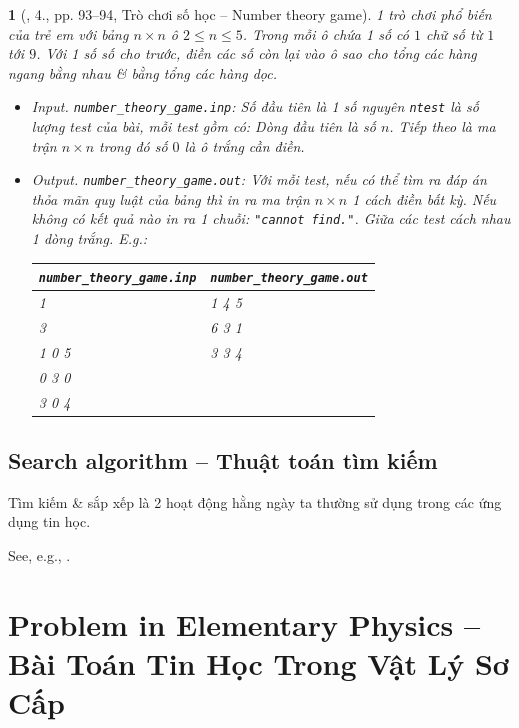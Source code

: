 \documentclass{article}
\newtheorem{baitoan}{}
\begin{document}
\begin{baitoan}[\cite{VietSTEM2021}, 4., pp. 93--94, Trò chơi số học -- Number theory game]
	1 trò chơi phổ biến của trẻ em với bảng $n\times n$ ô $2\le n\le5$. Trong mỗi ô chứa 1 số có $1$ chữ số từ $1$ tới $9$. Với 1 số số cho trước, điền các số còn lại vào ô sao cho tổng các hàng ngang bằng nhau \& bằng tổng các hàng dọc.
	\begin{itemize}
		\item {\sf Input.} \verb|number_theory_game.inp|: Số đầu tiên là 1 số nguyên {\tt ntest} là số lượng test của bài, mỗi test gồm có: Dòng đầu tiên là số $n$. Tiếp theo là ma trận $n\times n$ trong đó số $0$ là ô trắng cần điền.		
		\item {\sf Output.} \verb|number_theory_game.out|: Với mỗi test, nếu có thể tìm ra đáp án thỏa mãn quy luật của bảng thì in ra ma trận $n\times n$ 1 cách điền bất kỳ. Nếu không có kết quả nào in ra 1 chuỗi: {\tt "cannot find."}. Giữa các test cách nhau 1 dòng trắng. E.g.:
		\begin{table}[H]
			\centering
			\begin{tabular}{|l|l|}
				\hline
				\verb|number_theory_game.inp| & \verb|number_theory_game.out| \\
				\hline
				1 & 1 4 5 \\
				3 & 6 3 1 \\
				1 0 5 & 3 3 4 \\
				0 3 0 & \\
				3 0 4 & \\
				\hline
			\end{tabular}
		\end{table}		
	\end{itemize}
\end{baitoan}


\subsection{Search algorithm -- Thuật toán tìm kiếm}
Tìm kiếm \& sắp xếp là 2 hoạt động hằng ngày ta thường sử dụng trong các ứng dụng tin học.

See, e.g., \cite[Chap. 6: Searching]{Knuth1998}.


\section{Problem in Elementary Physics -- Bài Toán Tin Học Trong Vật Lý Sơ Cấp}
\end{document}
